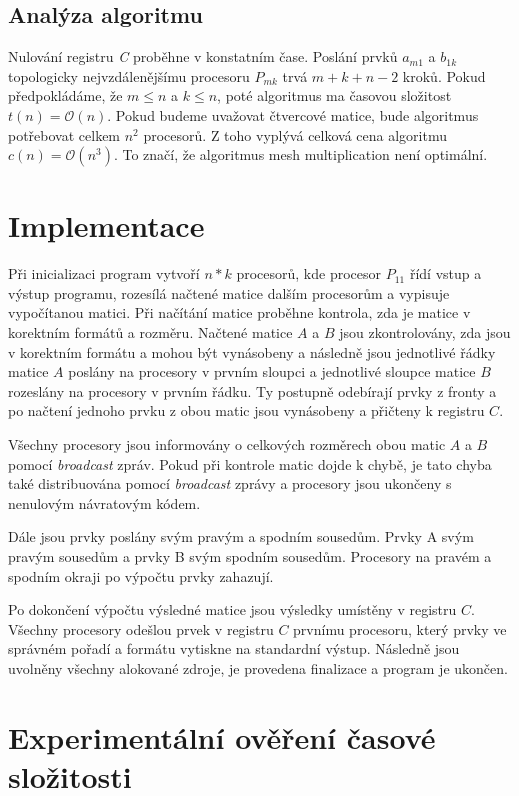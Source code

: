 \documentclass[11pt,a4paper]{article}
\begin{document}
\subsection{Analýza algoritmu}
Nulování registru \textit{C} proběhne v konstatním čase. Poslání prvků $a_{m1}$ a $b_{1k}$ topologicky nejvzdálenějšímu procesoru $P_{mk}$ trvá $m+k+n - 2$ kroků. Pokud předpokládáme, že $m \leq n$ a $k \leq n$, poté algoritmus ma časovou složitost $t(n) = \mathcal{O}(n)$. Pokud budeme uvažovat čtvercové matice, bude algoritmus potřebovat celkem $n^2$ procesorů. Z toho vyplývá celková cena algoritmu $c(n) = \mathcal{O}(n^3)$. To značí, že algoritmus mesh multiplication není optimální.

\section{Implementace}

Při inicializaci program vytvoří $n*k$ procesorů, kde procesor $P_{11}$ řídí vstup a výstup programu, rozesílá načtené matice dalším procesorům a vypisuje vypočítanou matici. Při načítání matice proběhne kontrola, zda je matice v korektním formátů a rozměru. Načtené matice $A$ a $B$ jsou zkontrolovány, zda jsou v korektním formátu a mohou být vynásobeny a následně jsou jednotlivé řádky matice $A$ poslány na procesory v prvním sloupci a jednotlivé sloupce matice $B$ rozeslány na procesory v prvním řádku. Ty postupně odebírají prvky z fronty a po načtení jednoho prvku z obou matic jsou vynásobeny a přičteny k registru $C$.

Všechny procesory jsou informovány o celkových rozměrech obou matic $A$ a $B$ pomocí \textit{broadcast} zpráv. Pokud při kontrole matic dojde k chybě, je tato chyba také distribuována pomocí \textit{broadcast} zprávy a procesory jsou ukončeny s nenulovým návratovým kódem.

Dále jsou prvky poslány svým pravým a spodním sousedům. Prvky A svým pravým sousedům a prvky B svým spodním sousedům. Procesory na pravém a spodním okraji po výpočtu prvky zahazují.

Po dokončení výpočtu výsledné matice jsou výsledky umístěny v registru $C$. Všechny procesory odešlou prvek v registru $C$ prvnímu procesoru, který prvky ve správném pořadí a formátu vytiskne na standardní výstup. Následně jsou uvolněny všechny alokované zdroje, je provedena finalizace a program je ukončen.

\section{Experimentální ověření časové složitosti}
\end{document}
